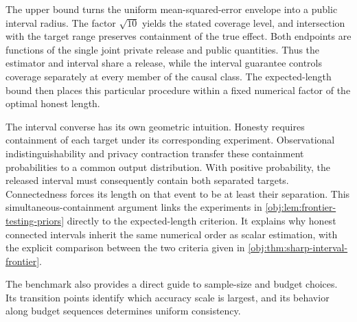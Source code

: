 \documentclass[11pt]{article}
\begin{document}

The upper bound turns the uniform mean-squared-error envelope into a public interval radius. The factor \(\sqrt{10}\) yields the stated coverage level, and intersection with the target range preserves containment of the true effect. Both endpoints are functions of the single joint private release and public quantities. Thus the estimator and interval share a release, while the interval guarantee controls coverage separately at every member of the causal class. The expected-length bound then places this particular procedure within a fixed numerical factor of the optimal honest length.

The interval converse has its own geometric intuition. Honesty requires containment of each target under its corresponding experiment. Observational indistinguishability and privacy contraction transfer these containment probabilities to a common output distribution. With positive probability, the released interval must consequently contain both separated targets. Connectedness forces its length on that event to be at least their separation. This simultaneous-containment argument links the experiments in \cref{obj:lem:frontier-testing-priors} directly to the expected-length criterion. It explains why honest connected intervals inherit the same numerical order as scalar estimation, with the explicit comparison between the two criteria given in \cref{obj:thm:sharp-interval-frontier}.

The benchmark also provides a direct guide to sample-size and budget choices. Its transition points identify which accuracy scale is largest, and its behavior along budget sequences determines uniform consistency.
\end{document}
